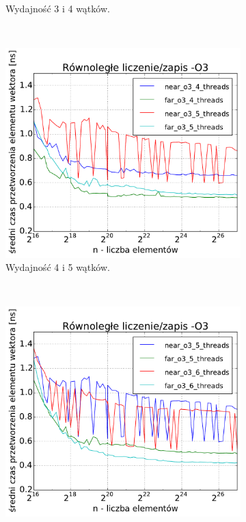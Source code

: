 \begin{figure}[!h]
\begin{subfigure}[c]{0.45\textwidth}
        \caption{Wydajność 3 i 4 wątków.}
    \end{subfigure}
    \\
    \vspace{0.5cm}
    \begin{subfigure}[c]{0.45\textwidth}
        \centering
        \includegraphics[width=\textwidth]{images/benchs_xeon/parallel_count_interesting3}
        \caption{Wydajność 4 i 5 wątków.}
    \end{subfigure}
    ~
    \begin{subfigure}[c]{0.45\textwidth}
        \centering
        \includegraphics[width=\textwidth]{images/benchs_xeon/parallel_count_interesting4}

\end{subfigure}
\end{figure}
